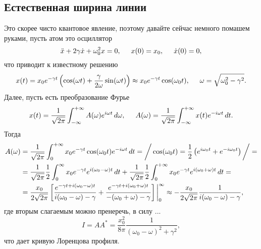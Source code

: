 \subsection{Естественная ширина линии}

Это скорее чисто квантовое явление, поэтому давайте сейчас немного помашем руками, пусть атом это осциллятор
\begin{equation*}
    \ddot{x} + 2 \gamma \dot{x}  +\omega_0^2 x = 0,
    \hspace{5 mm}
    x(0) = x_0,
    \hspace{5 mm}
    \dot{x}(0) = 0,
\end{equation*}
что приводит к известному решению
\begin{equation*}
    x(t) = x_0 e^{- \gamma t} \left(
        \cos (\omega t) + \frac{\gamma}{2\omega} \sin (\omega t)
    \right) \approx 
    x_0 e^{-\gamma t} \cos (\omega_0 t)
    ,
    \hspace{5 mm}
    \omega = \sqrt{\omega_0^2 - \gamma^2}.
\end{equation*}
Далее, пусть есть преобразование Фурье
\begin{equation*}
    x(t) = \frac{1}{\sqrt{2\pi}} \int_{-\infty}^{+\infty} A(\omega) e^{i \omega t} \, d \omega,
    \hspace{5 mm}
    A(\omega) = \frac{1}{\sqrt{2\pi}} \int_{-\infty}^{+\infty} x(t) e^{-i \omega t} \, d t.
\end{equation*}
Тогда
\begin{align*}
    A(\omega) &= \frac{1}{\sqrt{2\pi}} \int_{0}^{+\infty} x_0 e^{- \gamma t} \cos (\omega_0 t)
    e^{- i \omega t} \, d t = \bigg/
        \cos (\omega_0 t) = \frac{1}{2} \left( e^{i \omega_0 t} + e^{- i \omega_0 t}\right)
    \bigg/ = \\
    &=  \frac{1}{\sqrt{2\pi}} \frac{1}{2} \int_{0}^{\infty} x_0 e^{-\gamma t} e^{i (\omega_0 - \omega)t} \, d t + 
    \frac{1}{\sqrt{2\pi}} \frac{1}{2} \int_{0}^{+\infty} x_0 e^{-\gamma t} e^{i(\omega_0+\omega)t} \, d t = \\
    &= \frac{x_0}{2 \sqrt{2\pi}}  \left[
        \frac{e^{-\gamma t + i(\omega_0 - \omega) t}}{i (\omega_0 - \omega) - \gamma} + 
        \frac{e^{-\gamma t + i (\omega_0 + \omega)t}}{- (\omega_0 + \omega) - \gamma}
    \right] \bigg|_0^\infty \approx
    - \frac{x_0}{2 \sqrt{2\pi}} \frac{1}{i (\omega_0 - \omega) - \gamma}
    ,
\end{align*}
где вторым слагаемым можно пренеречь, в силу ...
\begin{equation*}
    I = A A^* = \frac{x_0^2}{8 \pi} \frac{1}{(\omega_0-\omega)^2 + \gamma^2},
\end{equation*}
что дает кривую Лоренцова профиля.

